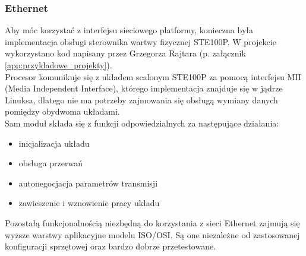 \documentclass[a4paper,12pt]{book}
\begin{document}
				\subsubsection{Ethernet}
					Aby móc korzystać z interfejsu sieciowego platformy, konieczna była implementacja obsługi sterownika wartwy fizycznej STE100P. W projekcie wykorzystano kod napisany przez Grzegorza Rajtara (p. załącznik \ref{app:przykladowe_projekty}).\\
					 Procesor komunikuje się z układem scalonym STE100P za pomocą interfejsu MII (Media Independent Interface), którego implementacja znajduje się w jądrze Linuksa, dlatego nie ma potrzeby zajmowania się obsługą wymiany danych pomiędzy obydwoma układami.\\
					 Sam moduł składa się z funkcji odpowiedzialnych za następujące działania:
					 \begin{itemize}
					 	\item inicjalizacja układu
					 	\item obsługa przerwań
					 	\item autonegocjacja parametrów transmisji
					 	\item zawieszenie i wznowienie pracy układu
					 \end{itemize}
					 Pozostałą funkcjonalnością niezbędną do korzystania z sieci Ethernet zajmują się wyższe warstwy aplikacyjne modelu ISO/OSI. Są one niezależne od zastosowanej konfiguracji sprzętowej oraz bardzo dobrze przetestowane.
\end{document}
